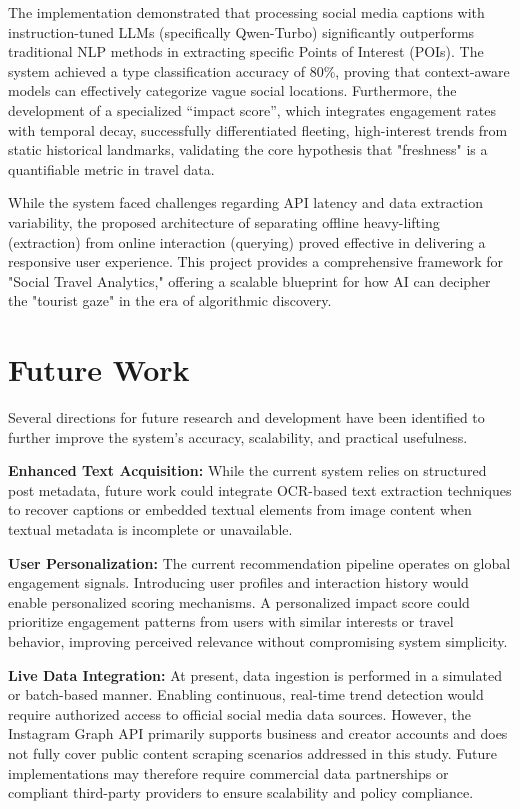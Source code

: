 \documentclass[a4paper,12pt]{report}
\begin{document}
The implementation demonstrated that processing social media captions with instruction-tuned LLMs (specifically Qwen-Turbo) significantly outperforms traditional NLP methods in extracting specific Points of Interest (POIs). The system achieved a type classification accuracy of 80\%, proving that context-aware models can effectively categorize vague social locations. Furthermore, the development of a specialized “impact score”, which integrates engagement rates with temporal decay, successfully differentiated fleeting, high-interest trends from static historical landmarks, validating the core hypothesis that "freshness" is a quantifiable metric in travel data.

While the system faced challenges regarding API latency and data extraction variability, the proposed architecture of separating offline heavy-lifting (extraction) from online interaction (querying) proved effective in delivering a responsive user experience. This project provides a comprehensive framework for "Social Travel Analytics," offering a scalable blueprint for how AI can decipher the "tourist gaze" in the era of algorithmic discovery.


\section{Future Work}
Several directions for future research and development have been identified to further improve the system’s accuracy, scalability, and practical usefulness.

\textbf{Enhanced Text Acquisition:} While the current system relies on structured post metadata, future work could integrate OCR-based text extraction techniques to recover captions or embedded textual elements from image content when textual metadata is incomplete or unavailable.

\textbf{User Personalization:} The current recommendation pipeline operates on global engagement signals. Introducing user profiles and interaction history would enable personalized scoring mechanisms. A personalized impact score could prioritize engagement patterns from users with similar interests or travel behavior, improving perceived relevance without compromising system simplicity.

\textbf{Live Data Integration:} At present, data ingestion is performed in a simulated or batch-based manner. Enabling continuous, real-time trend detection would require authorized access to official social media data sources. However, the Instagram Graph API primarily supports business and creator accounts and does not fully cover public content scraping scenarios addressed in this study. Future implementations may therefore require commercial data partnerships or compliant third-party providers to ensure scalability and policy compliance.
\end{document}

